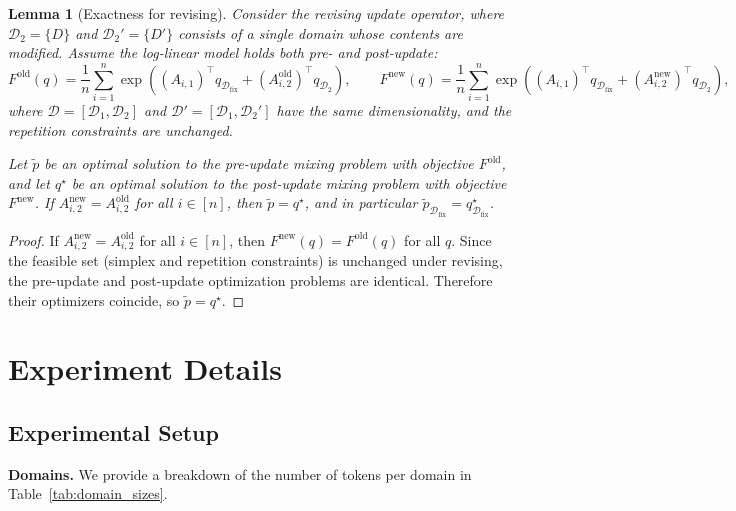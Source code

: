 \documentclass[table]{ai2style/ai2}
\newtheorem{lemma}{Lemma}
\newcommand{\D}[0]{\mathcal{D}}
\newcommand{\Dfix}[0]{\mathcal{D}_{\text{fix}}}
\begin{document}
\begin{lemma}[Exactness for revising]\label{lem:rev_exactness}
Consider the \emph{revising} update operator, where $\D_2=\{D\}$ and $\D_2'=\{D'\}$ consists of a single domain whose contents are modified.
Assume the log-linear model holds both pre- and post-update:
\[
F^{\mathrm{old}}(q) = \frac{1}{n}\sum_{i=1}^n \exp\!\left((A_{i,1})^\top q_{\Dfix} + (A_{i,2}^{\mathrm{old}})^\top q_{\D_2}\right),
\qquad
F^{\mathrm{new}}(q) = \frac{1}{n}\sum_{i=1}^n \exp\!\left((A_{i,1})^\top q_{\Dfix} + (A_{i,2}^{\mathrm{new}})^\top q_{\D_2}\right),
\]
where $\D=[\D_1,\D_2]$ and $\D'=[\D_1,\D_2']$ have the same dimensionality, and the repetition constraints are unchanged.

Let $\tilde p$ be an optimal solution to the pre-update mixing problem with objective $F^{\mathrm{old}}$, and let $q^\star$ be an optimal solution to the post-update mixing problem with objective $F^{\mathrm{new}}$.
If $A_{i,2}^{\mathrm{new}} = A_{i,2}^{\mathrm{old}}$ for all $i\in[n]$, then $\tilde p = q^\star$, and in particular $\tilde p_{\Dfix}=q^\star_{\Dfix}$.
\end{lemma}

\begin{proof}
If $A_{i,2}^{\mathrm{new}} = A_{i,2}^{\mathrm{old}}$ for all $i\in[n]$, then $F^{\mathrm{new}}(q)=F^{\mathrm{old}}(q)$ for all $q$.
Since the feasible set (simplex and repetition constraints) is unchanged under revising, the pre-update and post-update optimization problems are identical.
Therefore their optimizers coincide, so $\tilde p=q^\star$.
\end{proof}

\section{Experiment Details}\label{supp:details}

\subsection{Experimental Setup}\label{supp:exp_details}

\textbf{Domains.} We provide a breakdown of the number of tokens per domain in Table~\ref{tab:domain_sizes}.
\end{document}
